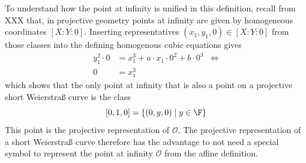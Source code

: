 To understand how the point at infinity is unified in this definition, recall from XXX that, in projective geometry points at infinity are given by homogeneous coordinates $[X:Y:0]$. Inserting representatives $(x_1,y_1,0)\in [X:Y:0]$ from those classes into the defining homogenous cubic equations gives
\begin{align*}
y_1^2\cdot 0 & = x_1^3+a\cdot x_1\cdot 0^2 + b\cdot 0^3 & \Leftrightarrow \\
0 & = x_1^3
\end{align*} 
which shows that the only point at infinity that is also a point on a projective short Weierstraß curve is the class 
$$
[0,1,0] = \{(0,y,0)\;|\; y\in \F\}
$$
This point is the projective representation of $\mathcal{O}$. The projective representation of a short Weierstraß curve therefore has the advantage to not need a special symbol to represent the point at infinity $\mathcal{O}$ from the affine definition.
